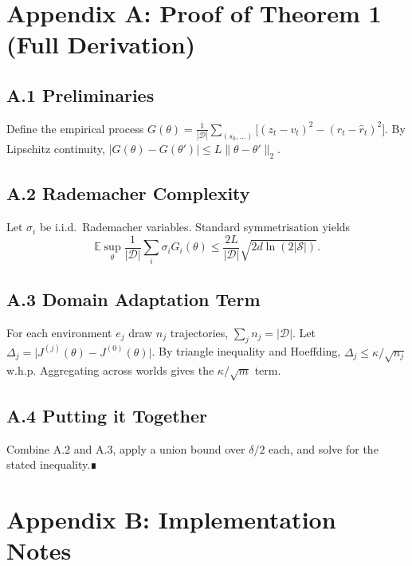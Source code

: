 \appendix
\section{Appendix A: Proof of Theorem 1 (Full Derivation)}\label{app:proof}

\subsection*{A.1 Preliminaries}

Define the empirical process \(G(\theta)=
\frac{1}{|\mathcal{D}|}\!\sum_{(s_0,\dots)}\!
\bigl[(z_t-v_t)^2 - (r_t-\hat r_t)^2\bigr]\).  
By Lipschitz continuity,
\(\bigl|G(\theta)-G(\theta')\bigr|\le L\|\theta-\theta'\|_2\).

\subsection*{A.2 Rademacher Complexity}

Let \(\sigma_i\) be i.i.d.\ Rademacher variables.  Standard symmetrisation
yields
\[
\mathbb{E}\sup_{\theta} \frac{1}{|\mathcal{D}|}
\sum_{i}\sigma_i G_i(\theta)
\le
\frac{2L}{|\mathcal{D}|}\sqrt{
  2d\ln(2|\mathcal{S}|)}.
\]

\subsection*{A.3 Domain Adaptation Term}

For each environment \(e_j\) draw \(n_j\) trajectories,
\(\sum_j n_j=|\mathcal{D}|\).  Let
\(\Delta_j=\lvert J^{(j)}(\theta)-J^{(0)}(\theta)\rvert\).
By triangle inequality and
Hoeffding, \(\Delta_j\le\kappa/\sqrt{n_j}\) w.h.p.  
Aggregating across worlds
gives the \(\kappa/\sqrt{m}\) term.

\subsection*{A.4 Putting it Together}

Combine A.2 and A.3, apply a union bound over
\(\delta/2\) each, and solve for the stated inequality.∎

\section{Appendix B: Implementation Notes}\label{app:impl}


